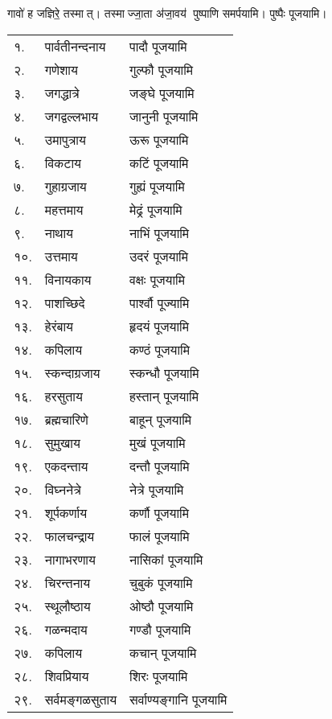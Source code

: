\begin{center}
{गावो॑ ह जज्ञिरे॒ तस्मात्। तस्माज्जा॒ता अ॑जा॒वय॑}
पुष्पाणि समर्पयामि।  पुष्पैः पूजयामि।

\begin{longtable}{ll@{~नमः — }l}
१. & पार्वतीनन्दनाय & पादौ पूजयामि\\
२. & गणेशाय & गुल्फौ पूजयामि\\
३. & जगद्धात्रे & जङ्घे पूजयामि\\
४. & जगद्वल्लभाय & जानुनी पूजयामि\\
५. & उमापुत्राय & ऊरू पूजयामि\\
६. & विकटाय & कटिं पूजयामि\\
७. & गुहाग्रजाय & गुह्यं पूजयामि\\
८. & महत्तमाय & मेढ्रं पूजयामि\\
९. & नाथाय & नाभिं पूजयामि\\
१०. & उत्तमाय & उदरं पूजयामि\\
११. & विनायकाय & वक्षः पूजयामि\\
१२. & पाशच्छिदे & पार्श्वौ पूज्यामि\\
१३. & हेरंबाय & हृदयं पूजयामि\\
१४. & कपिलाय & कण्ठं पूजयामि\\
१५. & स्कन्दाग्रजाय & स्कन्धौ पूजयामि\\
१६. & हरसुताय & हस्तान् पूजयामि\\
१७. & ब्रह्मचारिणे & बाहून् पूजयामि\\
१८. & सुमुखाय & मुखं पूजयामि\\
१९. & एकदन्ताय & दन्तौ पूजयामि\\
२०. & विघ्ननेत्रे & नेत्रे पूजयामि\\
२१. & शूर्पकर्णाय & कर्णौ पूजयामि\\
२२. & फालचन्द्राय & फालं पूजयामि\\
२३. & नागाभरणाय & नासिकां पूजयामि\\
२४. & चिरन्तनाय & चुबुकं पूजयामि\\
२५. & स्थूलौष्ठाय & ओष्ठौ पूजयामि\\
२६. & गळन्मदाय & गण्डौ पूजयामि\\
२७. & कपिलाय & कचान् पूजयामि\\
२८. & शिवप्रियाय & शिरः पूजयामि\\
२९. & सर्वमङ्गळसुताय & सर्वाण्यङ्गानि पूजयामि\\

\end{longtable}



\end{center}
